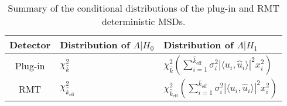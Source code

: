 \begin{table*}[ht!]
\centering
\begin{tabular}{cll}\toprule
 Detector & Distribution of $\Lambda|H_0$ & Distribution of $\Lambda|H_1$\\
\midrule
Plug-in & $\chi^2_{\widehat{k}}$ & $\chi^2_{\widehat{k}}\left(\sum_{i=1}^{\widehat{k}_{\text{eff}}}\sigma_i^2|\langle u_i,\widehat{u}_i\rangle|^2x_i^2\right)$\\
 RMT& $\chi^2_{\widehat{k}_{\text{eff}}}$ & $\chi^2_{\widehat{k}_{\text{eff}}}\left(\sum_{i=1}^{\widehat{k}_{\text{eff}}}\sigma_i^2|\langle u_i,\widehat{u}_i\rangle|^2x_i^2\right)$\\
\bottomrule
\end{tabular}
\caption{Summary of the conditional distributions of the plug-in and RMT deterministic MSDs. }\vskip-0.2cm
\label{table:summary_determ2}
\end{table*}
